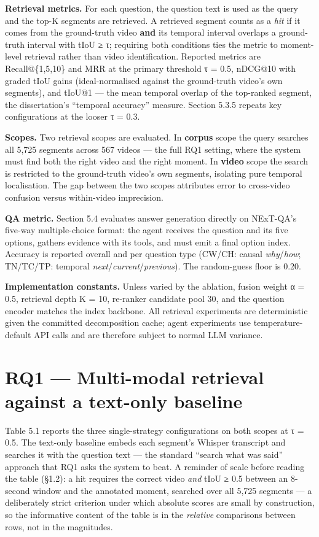 \textbf{Retrieval metrics.} For each question, the question text is used
as the query and the top-K segments are retrieved. A retrieved segment
counts as a \emph{hit} if it comes from the ground-truth video
\textbf{and} its temporal interval overlaps a ground-truth interval with
tIoU ≥ τ; requiring both conditions ties the metric to moment-level
retrieval rather than video identification. Reported metrics are
Recall@\{1,5,10\} and MRR at the primary threshold τ = 0.5, nDCG@10 with
graded tIoU gains (ideal-normalised against the ground-truth video's own
segments), and tIoU@1 --- the mean temporal overlap of the top-ranked
segment, the dissertation's ``temporal accuracy'' measure. Section 5.3.5
repeats key configurations at the looser τ = 0.3.

\textbf{Scopes.} Two retrieval scopes are evaluated. In \textbf{corpus}
scope the query searches all 5,725 segments across 567 videos --- the
full RQ1 setting, where the system must find both the right video and
the right moment. In \textbf{video} scope the search is restricted to
the ground-truth video's own segments, isolating pure temporal
localisation. The gap between the two scopes attributes error to
cross-video confusion versus within-video imprecision.

\textbf{QA metric.} Section 5.4 evaluates answer generation directly on
NExT-QA's five-way multiple-choice format: the agent receives the
question and its five options, gathers evidence with its tools, and must
emit a final option index. Accuracy is reported overall and per question
type (CW/CH: causal \emph{why}/\emph{how}; TN/TC/TP: temporal
\emph{next}/\emph{current}/\emph{previous}). The random-guess floor is
0.20.

\textbf{Implementation constants.} Unless varied by the ablation, fusion
weight α = 0.5, retrieval depth K = 10, re-ranker candidate pool 30, and
the question encoder matches the index backbone. All retrieval
experiments are deterministic given the committed decomposition cache;
agent experiments use temperature-default API calls and are therefore
subject to normal LLM variance.

\section{RQ1 --- Multi-modal retrieval against a text-only
baseline}

Table 5.1 reports the three single-strategy configurations on both
scopes at τ = 0.5. The text-only baseline embeds each segment's Whisper
transcript and searches it with the question text --- the standard
``search what was said'' approach that RQ1 asks the system to beat. A
reminder of scale before reading the table (§1.2): a hit requires the
correct video \emph{and} tIoU ≥ 0.5 between an 8-second window and the
annotated moment, searched over all 5,725 segments --- a deliberately
strict criterion under which absolute scores are small by construction,
so the informative content of the table is in the \emph{relative}
comparisons between rows, not in the magnitudes.

